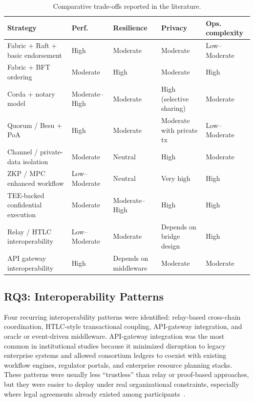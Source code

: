 \documentclass[journal]{IEEEtran}
\begin{document}
\begin{table}[t]
\caption{Comparative trade-offs reported in the literature.}
\label{tab:tradeoffs}
\centering
\begin{tabular}{p{}p{}p{}p{}p{}}
\toprule
\textbf{Strategy} & \textbf{Perf.} & \textbf{Resilience} & \textbf{Privacy} & \textbf{Ops. complexity} \\
\midrule
Fabric + Raft + basic endorsement & High & Moderate & Moderate & Low--Moderate \\
Fabric + BFT ordering & Moderate & High & Moderate & High \\
Corda + notary model & Moderate--High & Moderate & High (selective sharing) & Moderate \\
Quorum / Besu + PoA & High & Moderate & Moderate with private tx & Low--Moderate \\
Channel / private-data isolation & Moderate & Neutral & High & Moderate \\
ZKP / MPC enhanced workflow & Low--Moderate & Neutral & Very high & High \\
TEE-backed confidential execution & Moderate & Moderate--High & High & High \\
Relay / HTLC interoperability & Low--Moderate & Moderate & Depends on bridge design & High \\
API gateway interoperability & High & Depends on middleware & Moderate & Moderate \\
\bottomrule
\end{tabular}
\end{table}

\subsection{RQ3: Interoperability Patterns}

Four recurring interoperability patterns were identified: relay-based cross-chain coordination, HTLC-style transactional coupling, API-gateway integration, and oracle or event-driven middleware. API-gateway integration was the most common in institutional studies because it minimized disruption to legacy enterprise systems and allowed consortium ledgers to coexist with existing workflow engines, regulator portals, and enterprise resource planning stacks. These patterns were usually less ``trustless'' than relay or proof-based approaches, but they were easier to deploy under real organizational constraints, especially where legal agreements already existed among participants~\cite{belchior2021survey,schulte2019towards,hardjono2020towards,ren2023interoperability,madine2021appxchain,alhussayen2024oracle}.
\end{document}
